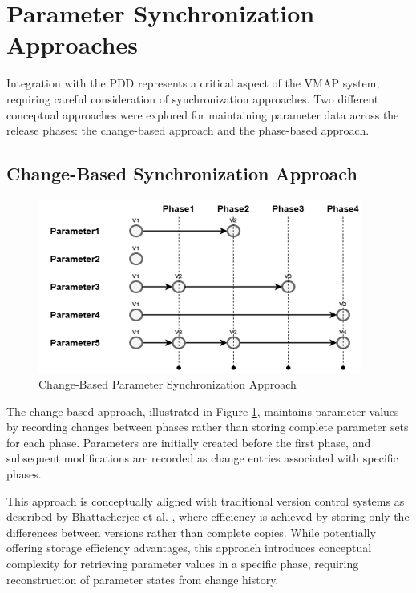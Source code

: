 \section{Parameter Synchronization Approaches}
\label{sec:parameter-sync-approaches}

Integration with the \ac{PDD} represents a critical aspect of the \ac{VMAP} system, requiring careful consideration of synchronization approaches. Two different conceptual approaches were explored for maintaining parameter data across the release phases: the change-based approach and the phase-based approach.

\subsection{Change-Based Synchronization Approach}
\label{subsec:change-based-sync}

\begin{figure}[h]
    \centering
    \includegraphics[width=0.95\textwidth]{figures/change_based_approach.png}
    \caption{Change-Based Parameter Synchronization Approach}
    \label{fig:change-based-sync}
\end{figure}

The change-based approach, illustrated in Figure \ref{fig:change-based-sync}, maintains parameter values by recording changes between phases rather than storing complete parameter sets for each phase. Parameters are initially created before the first phase, and subsequent modifications are recorded as change entries associated with specific phases.

This approach is conceptually aligned with traditional version control systems as described by Bhattacherjee et al. \cite{bhattacherjee2015principles}, where efficiency is achieved by storing only the differences between versions rather than complete copies. While potentially offering storage efficiency advantages, this approach introduces conceptual complexity for retrieving parameter values in a specific phase, requiring reconstruction of parameter states from change history.

